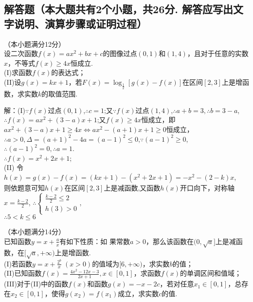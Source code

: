 \begin{exercise}
\section{解答题（本大题共有2个小题，共26分. 解答应写出文字说明、演算步骤或证明过程）}
  \item
    （本小题满分12分）\\
    设二次函数$f(x)=ax^2+bx+c$的图像过点$(0,1)$和$(1,4)$，且对于任意的实数$x$，不等式$f(x)\geq 4x$恒成立.\\
    (I)求函数$f(x)$的表达式；\\
    (II)设$g(x)=kx+1$，若$F(x)=\log_{\frac{1}2}[g(x)-f(x)]$在区间$[2,3]$上是增函数，求实数$k$的取值范围.\\
    \begin{answer}
      解：(I)$\because f(x)$过点$(0,1)$,$\therefore c=1$;又$\because f(x)$过点$(1,4)$,$\therefore a+b=3,\therefore b=3-a$,$\therefore f(x)=ax^2+(3-a)x+1$;又$f(x)\geq 4x$恒成立，即\\
      $ax^2+(3-a)x+1\geq 4x\Leftrightarrow ax^2-(a+1)x+1\geq 0$恒成立，$\therefore a>0,\Delta=(a+1)^2-4a=(a-1)^2\leq 0$,$\because (a-1)^2\geq 0$,$\therefore (a-1)^2=0,\therefore a=1$.\\
      $\therefore f(x)=x^2+2x+1$;\\
      (II) 令$h(x)=g(x)-f(x)=(kx+1)-(x^2+2x+1)=-x^2-(2-k)x$,\\
      则依题意可知$h(x)$在区间$[2,3]$上是减函数,又函数$h(x)$开口向下，对称轴$x=\frac{k-2}2$,
      $\therefore
      \begin{cases}
        \frac{k-2}2\leq 2\\
        h(3)>0
      \end{cases}$,\\
      $\therefore 5<k\leq 6$\\
    \end{answer}
    \vspace{7cm}
  \item
    （本小题满分14分）\\
    已知函数$y=x+\frac{a}x$有如下性质：如 果常数$a>0$，那么该函数在$(0,\sqrt a]$上是减函数，在$[\sqrt a,+\infty)$上是增函数.\\
    (I)若函数$y=x+\frac{2^b}x\;(x>0)$的值域为$[6,+\infty)$，求实数$b$的值；\\
    (II)已知函数$f(x)=\frac{4x^2-12x-3}{2x+1},x\in[0,1]$，求函数$f(x)$的单调区间和值域；\\
    (III)对于(II)中的函数$f(x)$和函数$g(x)=-x-2c$，若对任意$x_1\in[0,1]$，总存在$x_2\in[0,1]$，使得$g(x_2)=f(x_1)$成立，求实数$c$的值.\\

\end{exercise}
